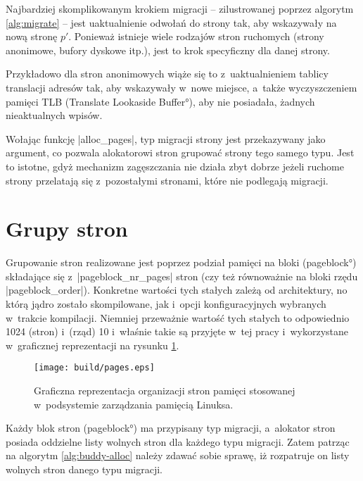Najbardziej skomplikowanym krokiem migracji -- zilustrowanej poprzez
algorytm \ref{alg:migrate} -- jest uaktualnienie odwołań do strony
tak, aby wskazywały na nową stronę $p'$.  Ponieważ istnieje wiele
rodzajów stron ruchomych (strony anonimowe, bufory dyskowe itp.), jest
to krok specyficzny dla danej strony.

Przykładowo dla stron anonimowych wiąże się to z~uaktualnieniem
tablicy translacji adresów tak, aby wskazywały w~nowe miejsce, a~także
wyczyszczeniem pamięci TLB (\ang{Translate Lookaside Buffer}), aby nie
posiadała, żadnych nieaktualnych wpisów.

Wołając funkcję \code|alloc_pages|, typ migracji strony jest
przekazywany jako argument, co pozwala alokatorowi stron grupować
strony tego samego typu.  Jest to istotne, gdyż mechanizm zagęszczania
nie działa zbyt dobrze jeżeli ruchome strony przelatają się
z~pozostałymi stronami, które nie podlegają migracji.


\section{Grupy stron}

Grupowanie stron realizowane jest poprzez podział pamięci na bloki
(\ang{pageblock}) składające się z~\code|pageblock_nr_pages| stron
(czy też równoważnie na bloki rzędu \code|pageblock_order|).
Konkretne wartości tych stałych zależą od architektury, no którą jądro
zostało skompilowane, jak i~opcji konfiguracyjnych wybranych w~trakcie
kompilacji.  Niemniej przeważnie wartość tych stałych to odpowiednio
1024 (stron) i~(rząd) 10 i~właśnie takie są przyjęte w~tej pracy
i~wykorzystane w~graficznej reprezentacji na rysunku \ref{fig:pages}.

\begin{figure}[tbp]
\begin{center}
\texttt{[image: build/pages.eps]}
\end{center}
\caption[Organizacja pamięci w~Linuksie.]{Graficzna reprezentacja
  organizacji stron pamięci stosowanej w~podsystemie zarządzania
  pamięcią Linuksa.}
\label{fig:pages}
\end{figure}

Każdy blok stron (\ang{pageblock}) ma przypisany typ migracji,
a~alokator stron posiada oddzielne listy wolnych stron dla każdego
typu migracji.  Zatem patrząc na algorytm \ref{alg:buddy-alloc} należy
zdawać sobie sprawę, iż rozpatruje on listy wolnych stron danego typu
migracji.

